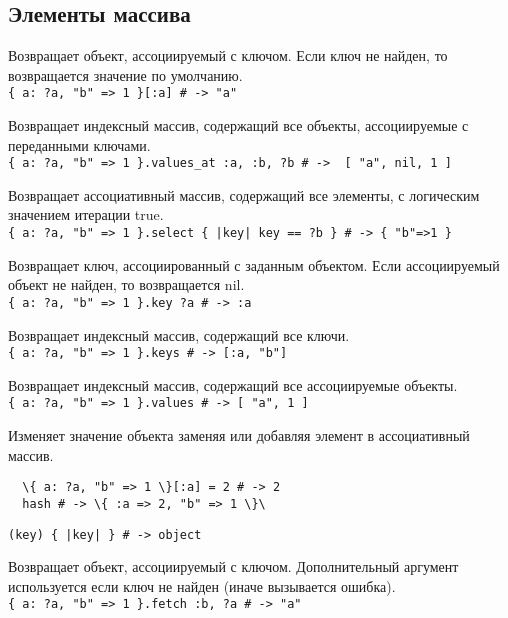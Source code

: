 \subsection*{Элементы массива} 

\begin{methodlist}
  Возвращает объект, ассоциируемый с ключом. Если ключ не найден, то возвращается значение по умолчанию. 
  \\\verb!{ a: ?a, "b" => 1 }[:a] # -> "a"!
  
  Возвращает индексный массив, содержащий все объекты, ассоциируемые с переданными ключами. 
  \\\verb!{ a: ?a, "b" => 1 }.values_at :a, :b, ?b # ->  [ "a", nil, 1 ]!
  
  Возвращает ассоциативный массив, содержащий все элементы, с логическим значением итерации true. 
  \\\verb!{ a: ?a, "b" => 1 }.select { |key| key == ?b } # -> { "b"=>1 }!
  
  Возвращает ключ, ассоциированный с заданным объектом. Если ассоциируемый объект не найден, то возвращается nil. 
  \\\verb!{ a: ?a, "b" => 1 }.key ?a # -> :a!

  Возвращает индексный массив, содержащий все ключи. 
  \\\verb!{ a: ?a, "b" => 1 }.keys # -> [:a, "b"]!
 
  Возвращает индексный массив, содержащий все ассоциируемые объекты. 
  \\\verb!{ a: ?a, "b" => 1 }.values # -> [ "a", 1 ]!
 
  Изменяет значение объекта заменяя или добавляя элемент в ассоциативный массив. 
  \begin{verbatim}
  \{ a: ?a, "b" => 1 \}[:a] = 2 # -> 2 
  hash # -> \{ :a => 2, "b" => 1 \}\
  \end{verbatim}
   
  \verb!(key) { |key| } # -> object!

  Возвращает объект, ассоциируемый с ключом. Дополнительный аргумент используется если ключ не найден (иначе вызывается ошибка). 
  \\\verb!{ a: ?a, "b" => 1 }.fetch :b, ?a # -> "a"!
\end{methodlist}

